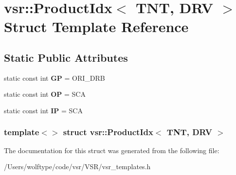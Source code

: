 \hypertarget{structvsr_1_1_product_idx_3_01_t_n_t_00_01_d_r_v_01_4}{\section{vsr\-:\-:Product\-Idx$<$ T\-N\-T, D\-R\-V $>$ Struct Template Reference}
\label{structvsr_1_1_product_idx_3_01_t_n_t_00_01_d_r_v_01_4}
}
\subsection*{Static Public Attributes}
\begin{DoxyCompactItemize}
\item 
\hypertarget{structvsr_1_1_product_idx_3_01_t_n_t_00_01_d_r_v_01_4_a3c30b4adaba6faf442405c2a830794ec}{static const int {\bfseries G\-P} = O\-R\-I\-\_\-\-D\-R\-B}\label{structvsr_1_1_product_idx_3_01_t_n_t_00_01_d_r_v_01_4_a3c30b4adaba6faf442405c2a830794ec}

\item 
\hypertarget{structvsr_1_1_product_idx_3_01_t_n_t_00_01_d_r_v_01_4_a055ff514d6d101c856411d211f14c10d}{static const int {\bfseries O\-P} = S\-C\-A}\label{structvsr_1_1_product_idx_3_01_t_n_t_00_01_d_r_v_01_4_a055ff514d6d101c856411d211f14c10d}

\item 
\hypertarget{structvsr_1_1_product_idx_3_01_t_n_t_00_01_d_r_v_01_4_a99b6e6f0bbfbd2f377be6a91c0750395}{static const int {\bfseries I\-P} = S\-C\-A}\label{structvsr_1_1_product_idx_3_01_t_n_t_00_01_d_r_v_01_4_a99b6e6f0bbfbd2f377be6a91c0750395}

\end{DoxyCompactItemize}
\subsubsection*{template$<$$>$ struct vsr\-::\-Product\-Idx$<$ T\-N\-T, D\-R\-V $>$}



The documentation for this struct was generated from the following file\-:\begin{DoxyCompactItemize}
\item 
/\-Users/wolftype/code/vsr/\-V\-S\-R/vsr\-\_\-templates.\-h\end{DoxyCompactItemize}
